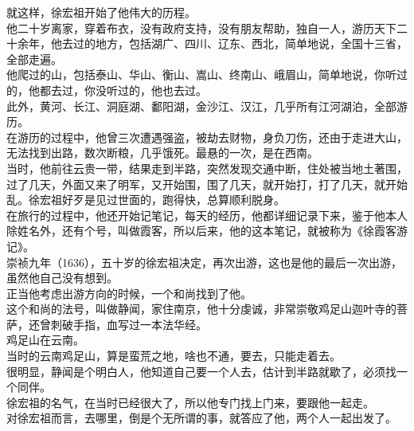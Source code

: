 \begin{multicols}{\theparacolNo}
就这样，徐宏祖开始了他伟大的历程。\\

他二十岁离家，穿着布衣，没有政府支持，没有朋友帮助，独自一人，游历天下二十余年，他去过的地方，包括湖广、四川、辽东、西北，简单地说，全国十三省，全部走遍。\\

他爬过的山，包括泰山、华山、衡山、嵩山、终南山、峨眉山，简单地说，你听过的，他都去过，你没听过的，他也去过。\\

此外，黄河、长江、洞庭湖、鄱阳湖，金沙江、汉江，几乎所有江河湖泊，全部游历。\\

在游历的过程中，他曾三次遭遇强盗，被劫去财物，身负刀伤，还由于走进大山，无法找到出路，数次断粮，几乎饿死。最悬的一次，是在西南。\\

当时，他前往云贵一带，结果走到半路，突然发现交通中断，住处被当地土著围，过了几天，外面又来了明军，又开始围，围了几天，就开始打，打了几天，就开始乱。徐宏祖好歹是见过世面的，跑得快，总算顺利脱身。\\

在旅行的过程中，他还开始记笔记，每天的经历，他都详细记录下来，鉴于他本人除姓名外，还有个号，叫做霞客，所以后来，他的这本笔记，就被称为《徐霞客游记》。\\

崇祯九年（1636），五十岁的徐宏祖决定，再次出游，这也是他的最后一次出游，虽然他自己没有想到。\\

正当他考虑出游方向的时候，一个和尚找到了他。\\

这个和尚的法号，叫做静闻，家住南京，他十分虔诚，非常崇敬鸡足山迦叶寺的菩萨，还曾刺破手指，血写过一本法华经。\\

鸡足山在云南。\\

当时的云南鸡足山，算是蛮荒之地，啥也不通，要去，只能走着去。\\

很明显，静闻是个明白人，他知道自己要一个人去，估计到半路就歇了，必须找一个同伴。\\

徐宏祖的名气，在当时已经很大了，所以他专门找上门来，要跟他一起走。\\

对徐宏祖而言，去哪里，倒是个无所谓的事，就答应了他，两个人一起出发了。\\


\end{multicols}
